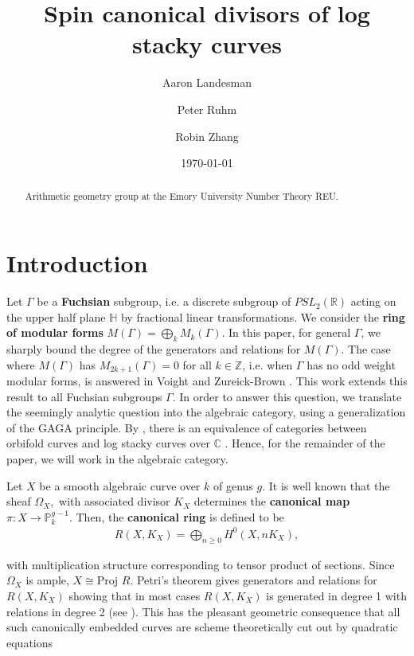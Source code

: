 \documentclass{amsart}
\title{Spin canonical divisors of log stacky curves}
\author{Aaron Landesman}
\author{Peter Ruhm}
\author{Robin Zhang}
\date{\today}
\theoremstyle{plain}
\theoremstyle{definition}
\theoremstyle{remark}
\numberwithin{equation}{section}
\newcommand\bh{{\mathbb H}}
\newcommand\BC{{\mathbb C}}
\newcommand\BR{{\mathbb R}}
\newcommand\BP{{\mathbb P}}
\newcommand\BZ{{\mathbb Z}}
\newcommand \proj{\text{Proj }}
\begin{document}
\begin{abstract}
  Arithmetic geometry group at the Emory University Number Theory
	REU.
\end{abstract}

\maketitle

\tableofcontents



\section{Introduction}
Let $\Gamma$ be a {\bf Fuchsian} subgroup, i.e. a discrete subgroup
of $PSL_2(\BR)$ acting on the upper half plane $\bh$ by fractional
linear transformations. We consider the {\bf ring of modular forms}
$M(\Gamma) = \bigoplus_k M_k(\Gamma)$. In this paper, for general
$\Gamma$, we sharply bound the degree of the generators and
relations for $M(\Gamma).$ The case where $M(\Gamma)$ has $M_{2k + 1
}(\Gamma) = 0$ for all $k \in \BZ$, i.e. when $\Gamma$ has no odd
weight modular forms, is answered in Voight and Zureick-Brown
\cite[Chapters 7-9]{vzb:stacky}. This work extends this result to
all Fuchsian subgroups $\Gamma$. In order to answer this question,
we translate the seemingly analytic question into the algebraic
category, using a generalization of the GAGA principle. By
\cite[Proposition 6.1.5]{vzb:stacky}, there is an equivalence of
categories between orbifold curves and log stacky curves over $\BC$
. Hence, for the remainder of the paper, we will work in the
algebraic category.

Let $X$ be a smooth algebraic curve over $k$ of genus $g$. It is
well known that the sheaf $\Omega _X,$ with associated divisor $K_X$
 determines the {\bf canonical map } $\pi:X \rightarrow \BP_k^{g - 1}$.
Then, the {\bf canonical ring} is defined to be
\begin{align*}
	R(X,K_X) = \bigoplus_{n \geq 0} H^0(X,nK_X),
\end{align*}

\noindent
with multiplication structure corresponding to tensor product of
sections. Since $\Omega_X$ is ample, $X \cong \proj R$. Petri's
theorem gives generators and relations for $R(X, K_X)$ showing that
in most cases $R(X, K_X)$ is generated in degree 1 with relations
in degree 2 (see \cite[p. 157]{saint-donat:proj}). This has the
pleasant geometric consequence that all such canonically embedded
curves are scheme theoretically cut out by quadratic equations
\end{document}
